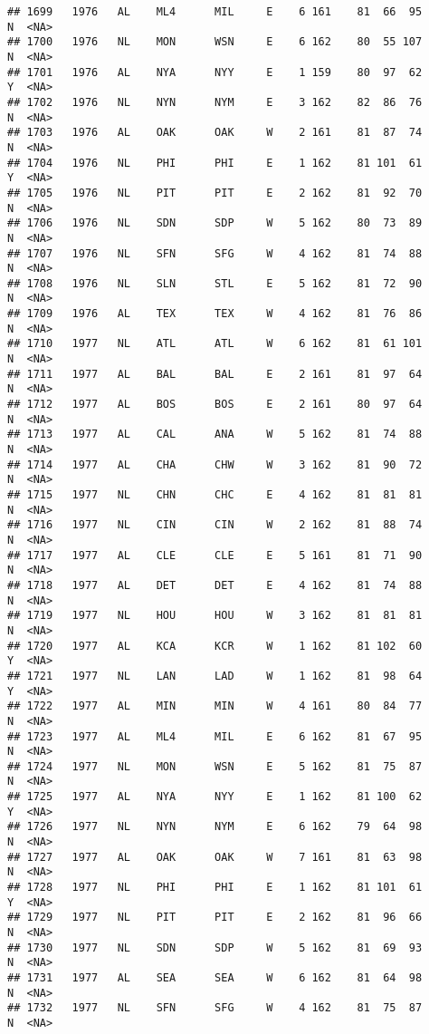 \documentclass[]{article}
\begin{document}
\begin{verbatim}
## 1699   1976   AL    ML4      MIL     E    6 161    81  66  95      N  <NA>
## 1700   1976   NL    MON      WSN     E    6 162    80  55 107      N  <NA>
## 1701   1976   AL    NYA      NYY     E    1 159    80  97  62      Y  <NA>
## 1702   1976   NL    NYN      NYM     E    3 162    82  86  76      N  <NA>
## 1703   1976   AL    OAK      OAK     W    2 161    81  87  74      N  <NA>
## 1704   1976   NL    PHI      PHI     E    1 162    81 101  61      Y  <NA>
## 1705   1976   NL    PIT      PIT     E    2 162    81  92  70      N  <NA>
## 1706   1976   NL    SDN      SDP     W    5 162    80  73  89      N  <NA>
## 1707   1976   NL    SFN      SFG     W    4 162    81  74  88      N  <NA>
## 1708   1976   NL    SLN      STL     E    5 162    81  72  90      N  <NA>
## 1709   1976   AL    TEX      TEX     W    4 162    81  76  86      N  <NA>
## 1710   1977   NL    ATL      ATL     W    6 162    81  61 101      N  <NA>
## 1711   1977   AL    BAL      BAL     E    2 161    81  97  64      N  <NA>
## 1712   1977   AL    BOS      BOS     E    2 161    80  97  64      N  <NA>
## 1713   1977   AL    CAL      ANA     W    5 162    81  74  88      N  <NA>
## 1714   1977   AL    CHA      CHW     W    3 162    81  90  72      N  <NA>
## 1715   1977   NL    CHN      CHC     E    4 162    81  81  81      N  <NA>
## 1716   1977   NL    CIN      CIN     W    2 162    81  88  74      N  <NA>
## 1717   1977   AL    CLE      CLE     E    5 161    81  71  90      N  <NA>
## 1718   1977   AL    DET      DET     E    4 162    81  74  88      N  <NA>
## 1719   1977   NL    HOU      HOU     W    3 162    81  81  81      N  <NA>
## 1720   1977   AL    KCA      KCR     W    1 162    81 102  60      Y  <NA>
## 1721   1977   NL    LAN      LAD     W    1 162    81  98  64      Y  <NA>
## 1722   1977   AL    MIN      MIN     W    4 161    80  84  77      N  <NA>
## 1723   1977   AL    ML4      MIL     E    6 162    81  67  95      N  <NA>
## 1724   1977   NL    MON      WSN     E    5 162    81  75  87      N  <NA>
## 1725   1977   AL    NYA      NYY     E    1 162    81 100  62      Y  <NA>
## 1726   1977   NL    NYN      NYM     E    6 162    79  64  98      N  <NA>
## 1727   1977   AL    OAK      OAK     W    7 161    81  63  98      N  <NA>
## 1728   1977   NL    PHI      PHI     E    1 162    81 101  61      Y  <NA>
## 1729   1977   NL    PIT      PIT     E    2 162    81  96  66      N  <NA>
## 1730   1977   NL    SDN      SDP     W    5 162    81  69  93      N  <NA>
## 1731   1977   AL    SEA      SEA     W    6 162    81  64  98      N  <NA>
## 1732   1977   NL    SFN      SFG     W    4 162    81  75  87      N  <NA>

\end{verbatim}
\end{document}
